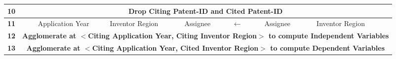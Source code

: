 \begin{sidewaystable}[htbp]
\begin{tabular}{|c|c|c|c|c|c|c|c|c|c|c|c|c|c|}
\midrule
\textbf{10} & \multicolumn{13}{c|}{\cellcolor[rgb]{ .886,  .937,  .855}\textbf{Drop Citing Patent-ID and Cited Patent-ID}} \\
\midrule
\textbf{11} & \cellcolor[rgb]{ .988,  .894,  .839} & \multicolumn{1}{p{5em}|}{\cellcolor[rgb]{ .988,  .894,  .839}Application Year} & \multicolumn{1}{p{5em}|}{\cellcolor[rgb]{ .988,  .894,  .839}Inventor Region} & \cellcolor[rgb]{ .988,  .894,  .839} & \cellcolor[rgb]{ .988,  .894,  .839}Assignee & \cellcolor[rgb]{ .988,  .894,  .839} & \textbf{$\leftarrow$} & \cellcolor[rgb]{ .741,  .843,  .933} & \cellcolor[rgb]{ .741,  .843,  .933}Assignee & \cellcolor[rgb]{ .741,  .843,  .933} & \multicolumn{1}{p{5em}|}{\cellcolor[rgb]{ .741,  .843,  .933}Inventor Region} & \cellcolor[rgb]{ .741,  .843,  .933} & \cellcolor[rgb]{ .741,  .843,  .933} \\
\midrule
\textbf{12} & \multicolumn{13}{c|}{\cellcolor[rgb]{ .886,  .937,  .855}\textbf{Agglomerate at $<$Citing Application Year, Citing Inventor Region$>$ to compute Independent Variables}} \\
\midrule
\textbf{13} & \multicolumn{13}{c|}{\cellcolor[rgb]{ .886,  .937,  .855}\textbf{Agglomerate at $<$Citing Application Year, Cited Inventor Region$>$ to compute Dependent Variables}} \\
\bottomrule
\end{tabular}
\end{sidewaystable}
